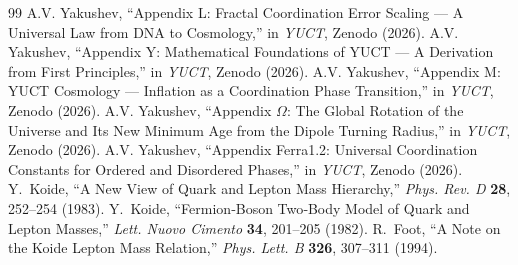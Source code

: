 \documentclass[11pt,a4paper]{article}
\theoremstyle{remark}
\begin{document}
	\begin{thebibliography}{99}
		 A.V. Yakushev, ``Appendix L: Fractal Coordination Error Scaling — A Universal Law from DNA to Cosmology,'' in \emph{YUCT}, Zenodo (2026).
		 A.V. Yakushev, ``Appendix Y: Mathematical Foundations of YUCT — A Derivation from First Principles,'' in \emph{YUCT}, Zenodo (2026).
		 A.V. Yakushev, ``Appendix M: YUCT Cosmology — Inflation as a Coordination Phase Transition,'' in \emph{YUCT}, Zenodo (2026).
		 A.V. Yakushev, ``Appendix $\Omega$: The Global Rotation of the Universe and Its New Minimum Age from the Dipole Turning Radius,'' in \emph{YUCT}, Zenodo (2026).
		 A.V. Yakushev, ``Appendix Ferra1.2: Universal Coordination Constants for Ordered and Disordered Phases,'' in \emph{YUCT}, Zenodo (2026).
		 Y.~Koide, ``A New View of Quark and Lepton Mass Hierarchy,''
		\emph{Phys. Rev. D} \textbf{28}, 252--254 (1983).
		 Y.~Koide, ``Fermion‑Boson Two‑Body Model of Quark and Lepton Masses,''
		\emph{Lett. Nuovo Cimento} \textbf{34}, 201--205 (1982).
		 R.~Foot, ``A Note on the Koide Lepton Mass Relation,''
		\emph{Phys. Lett. B} \textbf{326}, 307--311 (1994).
	\end{thebibliography}
	
\end{document}
